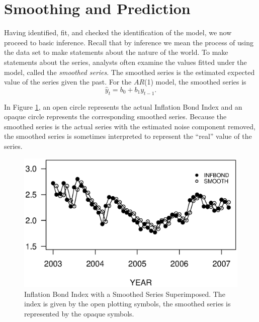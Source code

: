 \linejed

\newpage

\section{Smoothing and Prediction}\label{S8:AR1Smooth}

Having identified, fit, and checked the identification of the model, we now
proceed to basic inference. Recall that by inference we mean the process of
using the data set to make statements about the nature of the world. To make
statements about the series, analysts often examine the values fitted under
the model, called the \emph{smoothed series}. The smoothed series is the
estimated expected value of the series given the past. For the $AR$(1)
model, the smoothed series is%
\begin{equation*}
\widehat{y}_t=b_0+b_1y_{t-1}.
\end{equation*}

In Figure \ref{F8:InfBondSmooth}, an open circle represents the
actual Inflation Bond Index and an opaque circle represents the
corresponding smoothed series. Because the smoothed series is the
actual series with the estimated noise component removed, the
smoothed series is sometimes interpreted to represent the ``real''
value of the series.

\begin{figure}[htp]
  \begin{center}
    \includegraphics[width=.8\textwidth]
        {Chapter8AutoReg/InfBondSmooth.eps}
    \caption{\label{F8:InfBondSmooth} \small Inflation Bond Index with a Smoothed Series Superimposed. The
index is given by the open plotting symbols, the smoothed series is
represented by the opaque symbols.}
  \end{center}
\end{figure}

